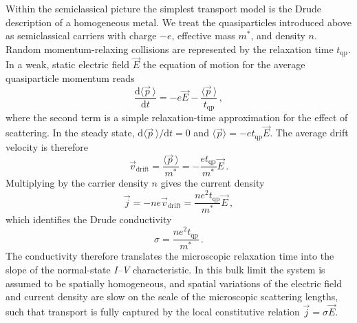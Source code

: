             Within the semiclassical picture the simplest transport model is the Drude description of a homogeneous metal. We treat the quasiparticles introduced above as semiclassical carriers with charge $-e$, effective mass $m^\ast$, and density $n$. Random momentum-relaxing collisions are represented by the relaxation time $t_\mathrm{qp}$. In a weak, static electric field $\vec{E}$ the equation of motion for the average quasiparticle momentum reads
            \begin{equation}
                \frac{\mathrm{d}\langle \vec{p}\, \rangle}{\mathrm{d}t}
                = -e \vec{E} - \frac{\langle \vec{p}\, \rangle}{t_\mathrm{qp}}\,,
                \label{eq:basics:drude-eom}
            \end{equation}
            where the second term is a simple relaxation-time approximation for the effect of scattering. In the steady state, $\mathrm{d}\langle \vec{p} \,\rangle / \mathrm{d}t = 0$ and $\langle \vec{p} \rangle = - e t_\mathrm{qp} \vec{E}$. The average drift velocity is therefore
            \begin{equation}
                \vec{v}_\mathrm{drift}
                = \frac{\langle \vec{p}\, \rangle}{m^\ast}
                = - \frac{e t_\mathrm{qp}}{m^\ast} \vec{E}\,.
                \label{eq:basics:drift-velocity}
            \end{equation}
            Multiplying by the carrier density $n$ gives the current density
            \begin{equation}
                \vec{j} = - n e \vec{v}_\mathrm{drift}
                = \frac{n e^2 t_\mathrm{qp}}{m^\ast} \vec{E}\,,
                \label{eq:basics:drude-current-density}
            \end{equation}
            which identifies the Drude conductivity
            \begin{equation}
                \sigma = \frac{n e^{2} t_\mathrm{qp}}{m^\ast}\,.
                \label{eq:basics:drude-conductivity}
            \end{equation}
            The conductivity therefore translates the microscopic relaxation time into the slope of the normal-state \textit{I--V} characteristic. In this bulk limit the system is assumed to be spatially homogeneous, and spatial variations of the electric field and current density are slow on the scale of the microscopic scattering lengths, such that transport is fully captured by the local constitutive relation $\vec{j} = \sigma \vec{E}$.

